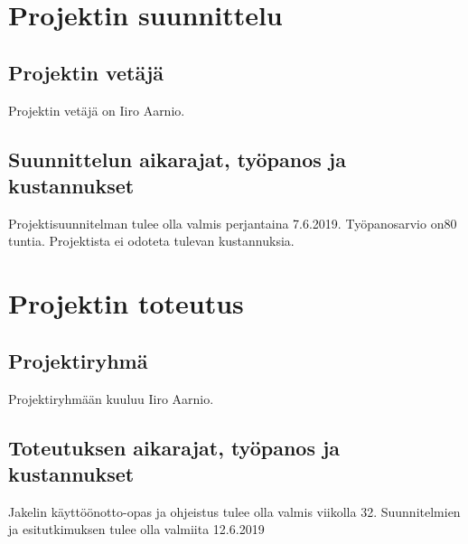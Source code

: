 \documentclass[a4paper, 12pt, finnish]{article}
\begin{document}
\section{Projektin suunnittelu}

\subsection{Projektin vetäjä}

Projektin vetäjä on Iiro Aarnio.

\subsection{Suunnittelun aikarajat, työpanos ja kustannukset}

Projektisuunnitelman tulee olla valmis perjantaina 7.6.2019. Työpanosarvio on80 tuntia. Projektista ei odoteta tulevan kustannuksia.

\section{Projektin toteutus}

\subsection{Projektiryhmä}

Projektiryhmään kuuluu Iiro Aarnio.

\subsection{Toteutuksen aikarajat, työpanos ja kustannukset}

Jakelin käyttöönotto-opas ja ohjeistus tulee olla valmis viikolla 32. Suunnitelmien ja esitutkimuksen tulee olla valmiita 12.6.2019
\end{document}
